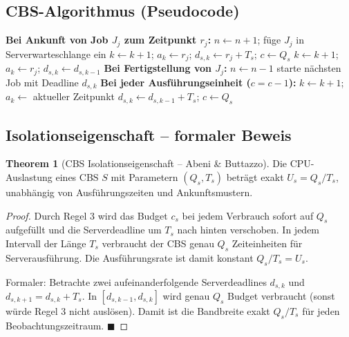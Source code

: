 ﻿\documentclass[a4paper,12pt]{report}
\theoremstyle{definition}
\newtheorem{theorem}{Theorem}[chapter]
\begin{document}
\subsection{CBS-Algorithmus (Pseudocode)}

\begin{algorithm}[H]
	\caption{Constant Bandwidth Server (CBS)}
	\begin{algorithmic}[1]
		\State \textbf{Bei Ankunft von Job $J_j$ zum Zeitpunkt $r_j$:}
		\State $n \leftarrow n+1$; füge $J_j$ in Serverwarteschlange ein
		 
		 
		\State $k \leftarrow k+1$; $a_k \leftarrow r_j$; $d_{s,k} \leftarrow r_j + T_s$; $c \leftarrow Q_s$
		\Else {}
		\State $k \leftarrow k+1$; $a_k \leftarrow r_j$; $d_{s,k} \leftarrow d_{s,k-1}$
		\EndIf
		\EndIf
		\State
		\State \textbf{Bei Fertigstellung von $J_j$:}
		\State $n \leftarrow n-1$
		 starte nächsten Job mit Deadline $d_{s,k}$ \EndIf
		\State
		\State \textbf{Bei jeder Ausführungseinheit ($c = c - 1$):}
		 
		\State $k \leftarrow k+1$; $a_k \leftarrow$ aktueller Zeitpunkt
		\State $d_{s,k} \leftarrow d_{s,k-1} + T_s$; $c \leftarrow Q_s$
		\EndIf
	\end{algorithmic}
\end{algorithm}

\subsection{Isolationseigenschaft -- formaler Beweis}

\begin{theorem}[CBS Isolationseigenschaft -- Abeni \& Buttazzo]
	\label{thm:cbs_isolation}
	Die CPU-Auslastung eines CBS $S$ mit Parametern $(Q_s, T_s)$ beträgt
	exakt $U_s = Q_s/T_s$, unabhängig von Ausführungszeiten und Ankunftsmustern.
\end{theorem}

\begin{proof}
	Durch Regel 3 wird das Budget $c_s$ bei jedem Verbrauch sofort auf $Q_s$
	aufgefüllt und die Serverdeadline um $T_s$ nach hinten verschoben. In jedem
	Intervall der Länge $T_s$ verbraucht der CBS genau $Q_s$ Zeiteinheiten für
	Serverausführung. Die Ausführungsrate ist damit konstant $Q_s/T_s = U_s$.

	Formaler: Betrachte zwei aufeinanderfolgende Serverdeadlines $d_{s,k}$ und
	$d_{s,k+1} = d_{s,k} + T_s$. In $[d_{s,k-1}, d_{s,k}]$ wird genau $Q_s$
	Budget verbraucht (sonst würde Regel 3 nicht auslösen). Damit ist die
	Bandbreite exakt $Q_s/T_s$ für jeden Beobachtungszeitraum. \hfill$\blacksquare$
\end{proof}
\end{document}
